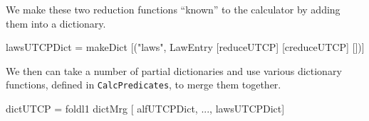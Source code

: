 We make these two reduction functions ``known'' to the calculator
by adding them into a dictionary.
\begin{code}
lawsUTCPDict
 = makeDict [("laws", LawEntry [reduceUTCP] [creduceUTCP] [])]
\end{code}
We then can take a number of partial dictionaries and use various
dictionary functions,
defined in \texttt{CalcPredicates}, to merge them together.
\begin{code}
dictUTCP = foldl1 dictMrg [ alfUTCPDict, ..., lawsUTCPDict]
\end{code}
